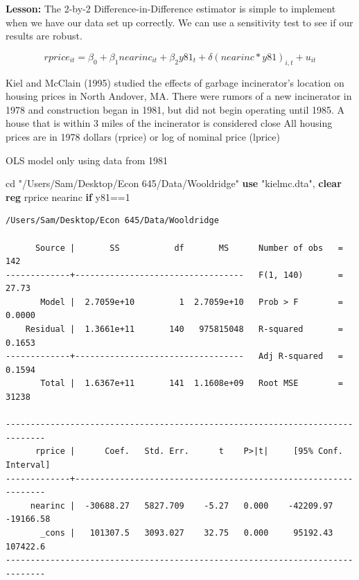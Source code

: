\documentclass[
]{book}
\newenvironment{Shaded}{\begin{snugshade}}{\end{snugshade}}
\newcommand{\KeywordTok}[1]{\textcolor[rgb]{0.13,0.29,0.53}{\textbf{#1}}}
\newcommand{\NormalTok}[1]{#1}
\newcommand{\StringTok}[1]{\textcolor[rgb]{0.31,0.60,0.02}{#1}}
\begin{document}
\textbf{Lesson:} The 2-by-2 Difference-in-Difference estimator is simple to implement
when we have our data set up correctly. We can use a sensitivity test to see
if our results are robust.

\[ rprice_{it}=\beta_0 + \beta_1 nearinc_{it} + \beta_2 y81_t + \delta (nearinc*y81)_{i,t} + u_{it} \]

Kiel and McClain (1995) studied the effects of garbage incinerator's location
on housing prices in North Andover, MA. There were rumors of a new incinerator
in 1978 and construction began in 1981, but did not begin operating until
1985. A house that is within 3 miles of the incinerator is considered close
All housing prices are in 1978 dollars (rprice) or log of nominal price
(lprice)

OLS model only using data from 1981

\begin{Shaded}
\begin{Highlighting}[]
\NormalTok{cd }\StringTok{"/Users/Sam/Desktop/Econ 645/Data/Wooldridge"}
\KeywordTok{use} \StringTok{"kielmc.dta"}\NormalTok{, }\KeywordTok{clear}
\KeywordTok{reg}\NormalTok{ rprice nearinc }\KeywordTok{if}\NormalTok{ y81==1}
\end{Highlighting}
\end{Shaded}

\begin{verbatim}
/Users/Sam/Desktop/Econ 645/Data/Wooldridge

      Source |       SS           df       MS      Number of obs   =       142
-------------+----------------------------------   F(1, 140)       =     27.73
       Model |  2.7059e+10         1  2.7059e+10   Prob > F        =    0.0000
    Residual |  1.3661e+11       140   975815048   R-squared       =    0.1653
-------------+----------------------------------   Adj R-squared   =    0.1594
       Total |  1.6367e+11       141  1.1608e+09   Root MSE        =     31238

------------------------------------------------------------------------------
      rprice |      Coef.   Std. Err.      t    P>|t|     [95% Conf. Interval]
-------------+----------------------------------------------------------------
     nearinc |  -30688.27   5827.709    -5.27   0.000    -42209.97   -19166.58
       _cons |   101307.5   3093.027    32.75   0.000     95192.43    107422.6
------------------------------------------------------------------------------
\end{verbatim}
\end{document}
